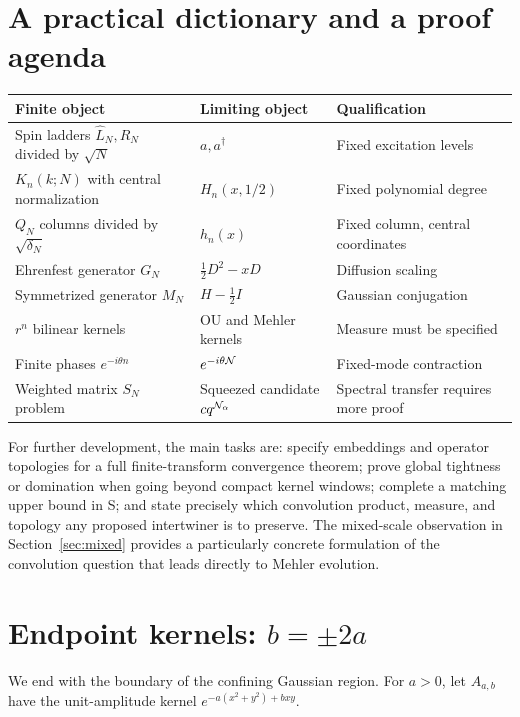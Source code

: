 \documentclass[11pt,reqno]{amsart}
\theoremstyle{remark}\newtheorem{remark}[proposition]{Remark}
\begin{document}
\section{A practical dictionary and a proof agenda}
\begin{center}\small
\begin{tabular}{p{}p{}p{}}
\toprule
Finite object & Limiting object & Qualification\\\midrule
Spin ladders $\widehat L_N,\widehat R_N$ divided by $\sqrt N$
& $a,a^\dagger$ & Fixed excitation levels\\
$K_n(k;N)$ with central normalization
& $H_n(x,1/2)$ & Fixed polynomial degree\\
$Q_N$ columns divided by $\sqrt{\delta_N}$
& $h_n(x)$ & Fixed column, central coordinates\\
Ehrenfest generator $G_N$ & $\tfrac12D^2-xD$ & Diffusion scaling\\
Symmetrized generator $M_N$ & $H-\tfrac12I$ & Gaussian conjugation\\
$r^n$ bilinear kernels & OU and Mehler kernels & Measure must be specified\\
Finite phases $e^{-i\theta n}$ & $e^{-i\theta\mathcal N}$ & Fixed-mode contraction\\
Weighted matrix $S_N$ problem & Squeezed candidate $cq^{\mathcal N_\alpha}$
& Spectral transfer requires more proof\\\bottomrule
\end{tabular}
\end{center}
For further development, the main tasks are: specify embeddings and
operator topologies for a full finite-transform convergence theorem;
prove global tightness or domination when going beyond compact kernel
windows; complete a matching upper bound in S; and state precisely
which convolution product, measure, and topology any proposed
intertwiner is to preserve. The mixed-scale observation in
Section~\ref{sec:mixed} provides a particularly concrete formulation of
the convolution question that leads directly to Mehler evolution.

\section{Endpoint kernels: $b=\pm2a$}\label{sec:endpoints}
We end with the boundary of the confining Gaussian region. For $a>0$,
let $A_{a,b}$ have the unit-amplitude kernel
$e^{-a(x^2+y^2)+bxy}$.
\end{document}
